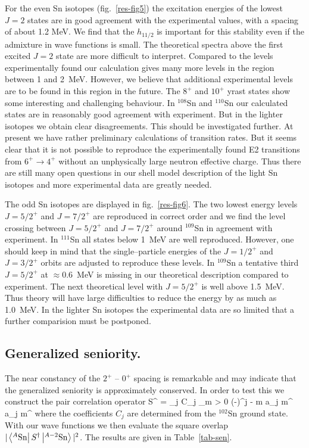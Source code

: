 For the even Sn isotopes (fig.~\ref{res-fig5}) the excitation energies
of the lowest $J=2$ states  are in good agreement with
the experimental values, with a spacing of about 1.2 MeV.
We find that the $h_{11/2}$ is important for this stability
even if the admixture  in wave functions is small. 
The theoretical spectra above the first excited $J = 2$ state
are  more difficult to interpret.
Compared to the levels experimentally found our calculation gives many
more levels in the region between 1 and 2~MeV. However, we believe
that additional experimental levels are to be found
in this region in the future.
The $8^{+}$ and $10^{+}$ yrast states show some interesting and 
challenging behaviour.  In $^{108}$Sn   and $^{110}$Sn our calculated
states are in reasonably good agreement with experiment. But in
the lighter isotopes we obtain  clear disagreements. This should 
be investigated further.
At present we have rather preliminary calculations of transition rates.
But it seems clear that it is not possible to reproduce
the experimentally found E2 transitions from
$6^{+} \longrightarrow 4^{+}$ 
without an  unphysically large  neutron effective charge.
Thus there are still many open questions in our shell model description of 
the light Sn isotopes and more experimental data are  greatly needed.

The odd Sn isotopes are displayed in fig.~\ref{res-fig6}. The two lowest energy
levels $J=5/2^{+}$ and $J=7/2^{+}$ are reproduced in correct order
and we find the level crossing between $J=5/2^{+}$ and $J=7/2^{+}$ around
$^{109}$Sn in agreement with experiment.
In $^{111}$Sn all states below 1~MeV are well reproduced. However, one
should keep in mind that the single--particle energies of the
$J=1/2^{+}$ and $J=3/2^{+}$ orbits are adjusted to reproduce these
levels. In $^{109}$Sn a tentative third $J=5/2^{+}$ at $\approx 0.6$~MeV is 
missing in our theoretical description compared to experiment. 
The next theoretical level with $J=5/2^{+}$ is
well above 1.5~MeV. Thus  theory will have large difficulties to
reduce the energy by as much as 1.0~MeV.
In the lighter Sn isotopes the experimental data are so limited that 
a further comparision must be postponed.
%
\subsection{Generalized seniority.}
%
The near constancy of the $2^{+}$ -- $0^{+}$ spacing is remarkable and may
indicate that the generalized seniority is approximately conserved\cite{tal77}.
In order to test this we construct the pair correlation operator
%
\be
S^{\dagger} = \sum_j C_j   \sum_{m > 0} (-)^{j - m} 
             a_{j m}^{\dagger} a_{j m}^{\dagger}
\label{sen}
\ee
where the coefficients $C_j$ are determined from the $^{102}$Sn
ground state. With our wave functions we then evaluate the square overlap
$|\bra{^{A}\makebox{Sn}} S^{\dagger} \ket{^{A - 2}\makebox{Sn}}|^{2}$.
The results are given in Table~\ref{tab-sen}.

